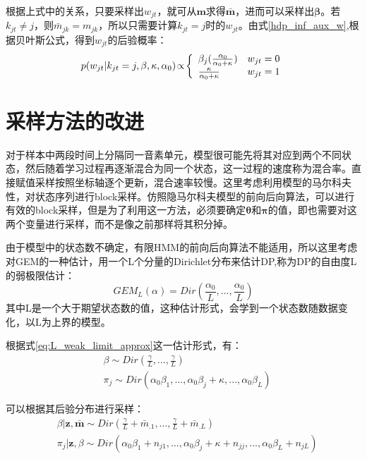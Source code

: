 根据上式中的关系，只要采样出$w_{jt}$，就可从${\bm m}$求得$\bar{\bm m}$，进而可以采样出${\bm \beta}$。若$k_{jt} \neq j $，则$\bar{m}_{jk} = m_{jk}$，所以只需要计算$k_{jt} = j $时的$w_{jt}$。由式\eqref{hdp_inf_aux_w},根据贝叶斯公式，得到$w_{jt}$的后验概率：
\begin{equation}\vspace{-2pt}
p(w_{jt}|k_{jt} = j,\beta,\kappa,\alpha_0)\!\propto\!\left\{
\begin{array}{lll}
\beta_j(\frac{\alpha_0}{\alpha_0+\kappa}) & w_{jt} = 0\\
\frac{\kappa}{\alpha_0+\kappa}  & w_{jt} = 1\\
\end{array}
\right.\vspace{-2pt}
\end{equation}


\section{采样方法的改进}

对于样本中两段时间上分隔同一音素单元，模型很可能先将其对应到两个不同状态，然后随着学习过程再逐渐混合为同一个状态，这一过程的速度称为混合率。直接赋值采样按照坐标轴逐个更新，混合速率较慢。这里考虑利用模型的马尔科夫性，对状态序列进行block采样。仿照隐马尔科夫模型的前向后向算法，可以进行有效的block采样，但是为了利用这一方法，必须要确定${\bm \theta}$和${\bm \pi}$的值，即也需要对这两个变量进行采样，而不是像之前那样将其积分掉。

由于模型中的状态数不确定，有限HMM的前向后向算法不能适用，所以这里考虑对GEM的一种估计，用一个L个分量的Dirichlet分布来估计DP,称为DP的自由度L的弱极限估计：
\begin{equation}
{GEM}_L(\alpha) = Dir(\frac{\alpha_0}{L},...,\frac{\alpha_0}{L}) \label{eq:L_weak_limit_approx}
\end{equation}
其中L是一个大于期望状态数的值，这种估计形式，会学到一个状态数随数据变化，以L为上界的模型。

根据式\eqref{eq:L_weak_limit_approx}这一估计形式，有：
\begin{equation}
\begin{split}
& \beta \sim Dir(\frac{\gamma}{L},...,\frac{\gamma}{L}) \\
& \pi_j \sim Dir(\alpha_0\beta_1,...,\alpha_0\beta_j + \kappa,...,\alpha_0\beta_L) 
\end{split}
\end{equation}

可以根据其后验分布进行采样：
\begin{equation}
\begin{split}
& {\beta|{\bm z},\bar{\bm {m}}} \sim Dir(\frac{\gamma}{L} + {\bar{m}}_{.1},...,\frac{\gamma}{L} + {\bar{m}}_{.L}) \\
& {\pi_j|{\bm z},\beta} \sim Dir(\alpha_0 \beta_1 + n_{j1},...,\alpha_0 \beta_j + \kappa + n_{jj},...,\alpha_0 \beta_L + n_{jL}) 
\end{split}
\end{equation}


